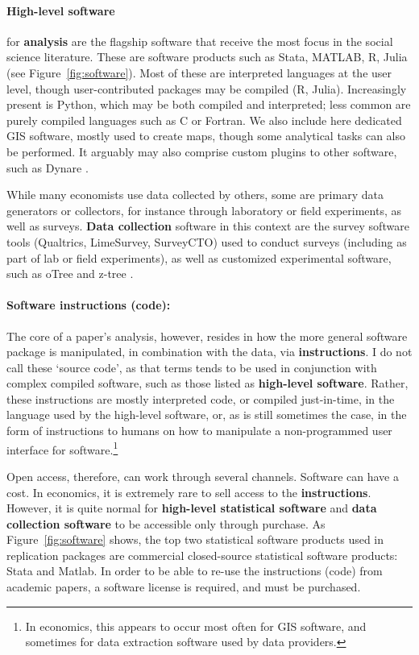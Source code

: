 \documentclass{article}
\begin{document}
\paragraph{High-level software} for \textbf{analysis} are the flagship software  that receive the most  focus in the social science literature. These are software products such as Stata, MATLAB, R, Julia (see Figure~\ref{fig:software}). Most of these are interpreted languages at the user level, though user-contributed packages may be compiled (R, Julia). Increasingly present is Python, which may be both compiled and interpreted; less common are purely compiled languages such as C or Fortran. We also include here dedicated \ac{GIS} software, mostly used to create maps, though some analytical tasks can also be performed. It arguably may also comprise custom plugins to other software, such as Dynare \citep{adjemian_dynare_2024,cherrier_write_2023}.



While many economists use data collected by others, some are primary data generators or collectors, for instance through laboratory or field experiments, as well as surveys. \textbf{Data collection} software in this context are the survey software tools (Qualtrics, LimeSurvey, SurveyCTO) used to conduct surveys (including as part of lab or field experiments), as well as customized experimental software, such as oTree \citep{chen_otreeopen-source_2016} and z-tree \citep{fischbacher_z-tree_2021}.

\paragraph{Software instructions (code):} The core of a paper's analysis, however, resides in how the more general software package is manipulated, in combination with the data, via \textbf{instructions}. I do not call these `source code', as that terms tends to be used in conjunction with complex compiled software, such as those listed as \textbf{high-level software}. Rather, these instructions are mostly interpreted code, or compiled just-in-time, in the language used by the high-level software, or, as is still sometimes the case, in the form of instructions to humans on how to manipulate a non-programmed user interface for software.\footnote{In economics, this appears to occur most often for \ac{GIS} software, and sometimes for data extraction software used by data providers.}

Open access, therefore, can work through several channels. Software can have a cost. In economics, it is extremely rare to sell access to the \textbf{instructions}. However, it is quite normal for \textbf{high-level statistical software} and \textbf{data collection software} to be accessible only through purchase. As Figure~\ref{fig:software} shows, the top two statistical software products used in replication packages are commercial closed-source statistical software products: Stata and Matlab. In order to be able to re-use the instructions (code) from academic papers, a software license is required, and must be purchased. 
\end{document}
